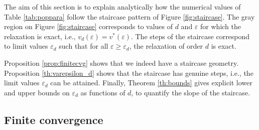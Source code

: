 \documentclass[a4paper,12pt]{article}
\newcommand{\adrien}[1]{{\color{magenta} #1}}
\begin{document}
The aim of this section is to explain analytically how the numerical values of Table \ref{tab:poppara} follow the staircase pattern of Figure \ref{fig:staircase}.
The gray region on Figure \ref{fig:staircase} corresponds to values of $d$ and $\varepsilon$ for which the relaxation is exact, i.e., $v_d(\varepsilon)=v^*(\varepsilon)$.
The steps of the staircase correspond to limit values $\varepsilon_d$ such that for all $\varepsilon \geq \varepsilon_d$, the relaxation of order $d$ is exact.

{Proposition} \ref{prop:finitecvg} shows that we indeed have a staircase geometry. {Proposition} \ref{th:varepsilon_d} shows that the staircase has genuine steps, i.e., the limit values $\varepsilon_d$ can be attained. Finally, Theorem \ref{th:bounds} gives explicit lower and upper bounds on $\varepsilon_d$ as functions of $d$, to quantify the slope of the staircase.

\subsection{Finite convergence}\label{sec:finite}

\end{document}
